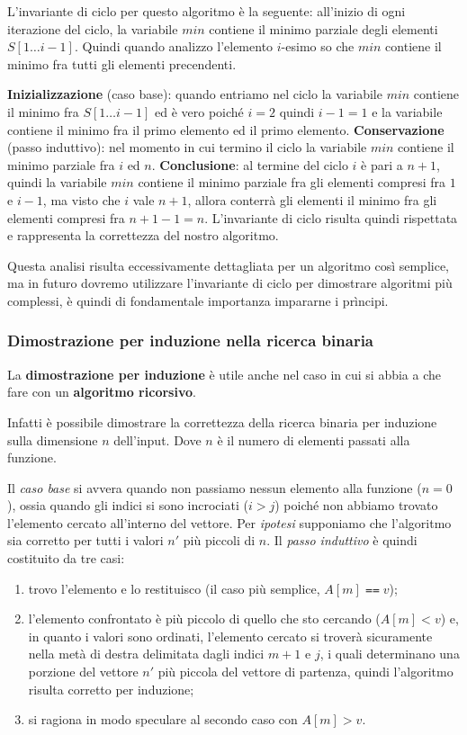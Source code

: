 L'invariante di ciclo per questo algoritmo è la seguente: all'inizio di ogni iterazione del ciclo, la variabile \(min\) contiene il minimo parziale degli elementi \(S[1\dots i-1]\).
Quindi quando analizzo l'elemento \(i\)-esimo so che \(min\) contiene il minimo fra tutti gli elementi precendenti.

\textbf{Inizializzazione} (caso base): quando entriamo nel ciclo la variabile \(min\) contiene il minimo fra \(S[1\dots i-1]\) ed è vero poiché \(i = 2\) quindi \(i-1 = 1\) e la variabile contiene il minimo fra il primo elemento ed il primo elemento.
\textbf{Conservazione} (passo induttivo): nel momento in cui termino il ciclo la variabile \(min\) contiene il minimo parziale fra \(i\) ed \(n\).
\textbf{Conclusione}: al termine del ciclo \(i\) è pari a \(n+1\), quindi la variabile \(min\) contiene il minimo parziale fra gli elementi compresi fra \(1\) e \(i-1\), ma visto che \(i\) vale \(n+1\), allora conterrà gli elementi il minimo fra gli elementi compresi fra \(n+1-1 = n\).
L'invariante di ciclo risulta quindi rispettata e rappresenta la correttezza del nostro algoritmo.

Questa analisi risulta eccessivamente dettagliata per un algoritmo così semplice, ma in futuro dovremo utilizzare l'invariante di ciclo per dimostrare algoritmi più complessi, è quindi di fondamentale importanza impararne i pr\`incipi.

\subsubsection{Dimostrazione per induzione nella ricerca binaria}

La \textbf{dimostrazione per induzione} è utile anche nel caso in cui si abbia a che fare con un \textbf{algoritmo ricorsivo}.

Infatti è possibile dimostrare la correttezza della ricerca binaria per induzione sulla dimensione \(n\) dell'input.
Dove \(n\) è il numero di elementi passati alla funzione.

Il \emph{caso base}  si avvera quando non passiamo nessun elemento alla funzione (\(n=0\)), ossia quando gli indici si sono incrociati (\(i > j\)) poiché non abbiamo trovato l'elemento cercato all'interno del vettore.
Per \emph{ipotesi} supponiamo che l'algoritmo sia corretto per tutti i valori \(n'\) più piccoli di \(n\).
Il \emph{passo induttivo} è quindi costituito da tre casi:
\begin{enumerate}
	\item trovo l'elemento e lo restituisco (il caso più semplice, \(A[m] \Equal v\));
	\item l'elemento confrontato è più piccolo di quello che sto cercando (\(A[m] < v\)) e, in quanto i valori sono ordinati, l'elemento cercato si troverà sicuramente nella metà di destra delimitata dagli indici \(m+1\) e \(j\), i quali determinano una porzione del vettore \(n'\) più piccola del vettore di partenza, quindi l'algoritmo risulta corretto per induzione;
	\item si ragiona in modo speculare al secondo caso con \(A[m] > v\).
\end{enumerate}

